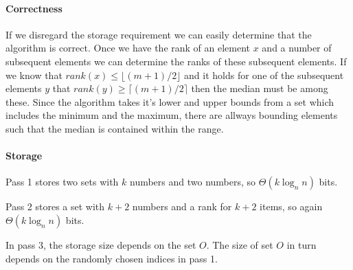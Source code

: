 \paragraph{Correctness}
If we disregard the storage requirement we can easily determine that the algorithm is correct. Once we have the rank of an element $x$ and a number of subsequent elements we can determine the ranks of these subsequent elements. If we know that $\textit{rank}(x) \leq \lfloor (m+1)/2 \rfloor$ and it holds for one of the subsequent elements $y$ that $\textit{rank}(y) \geq \lceil (m+1)/2 \rceil$ then the median must be among these. Since the algorithm takes it's lower and upper bounds from a set which includes the minimum and the maximum, there are allways bounding elements such that the median is contained within the range.

\paragraph{Storage}
Pass 1 stores two sets with $k$ numbers and two numbers, so $\Theta(k\log_n{n})$ bits.

Pass 2 stores a set with $k+2$ numbers and a rank for $k+2$ items, so again $\Theta(k\log_n{n})$ bits.

In pass 3, the storage size depends on the set $O$.
The size of set $O$ in turn depends on the randomly chosen indices in pass 1.
